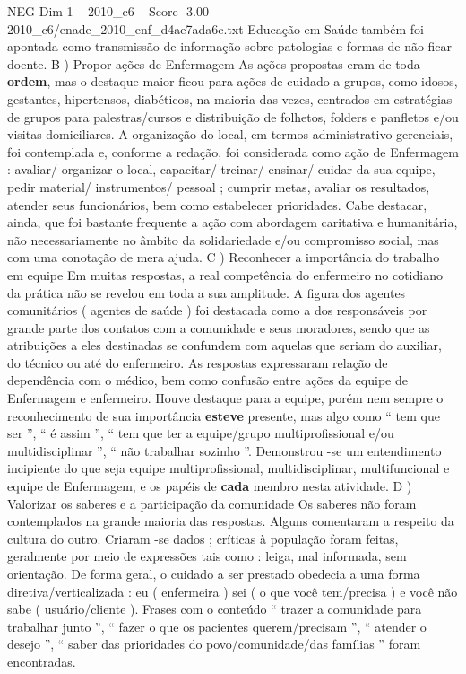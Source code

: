 \begin{textsample}{NEG Dim 1 – 2010\_c6 – Score -3.00 – 2010\_c6/enade\_2010\_enf\_d4ae7ada6c.txt}
Educação em Saúde também foi apontada como transmissão de informação sobre patologias e formas de não ficar doente.
B ) Propor ações de Enfermagem As ações propostas eram de toda \textbf{ordem}, mas o destaque maior ficou para ações de cuidado a grupos, como idosos, gestantes, hipertensos, diabéticos, na maioria das vezes, centrados em estratégias de grupos para palestras/cursos e distribuição de folhetos, folders e panfletos e/ou visitas domiciliares.
A organização do local, em termos administrativo-gerenciais, foi contemplada e, conforme a redação, foi considerada como ação de Enfermagem : avaliar/ organizar o local, capacitar/ treinar/ ensinar/ cuidar da sua equipe, pedir material/ instrumentos/ pessoal ; cumprir metas, avaliar os resultados, atender seus funcionários, bem como estabelecer prioridades.
Cabe destacar, ainda, que foi bastante frequente a ação com abordagem caritativa e humanitária, não necessariamente no âmbito da solidariedade e/ou compromisso social, mas com uma conotação de mera ajuda.
C ) Reconhecer a importância do trabalho em equipe Em muitas respostas, a real competência do enfermeiro no cotidiano da prática não se revelou em toda a sua amplitude.
A figura dos agentes comunitários ( agentes de saúde ) foi destacada como a dos responsáveis por grande parte dos contatos com a comunidade e seus moradores, sendo que as atribuições a eles destinadas se confundem com aquelas que seriam do auxiliar, do técnico ou até do enfermeiro.
As respostas expressaram relação de dependência com o médico, bem como confusão entre ações da equipe de Enfermagem e enfermeiro.
Houve destaque para a equipe, porém nem sempre o reconhecimento de sua importância \textbf{esteve} presente, mas algo como “ tem que ser ”, “ é assim ”, “ tem que ter a equipe/grupo multiprofissional e/ou multidisciplinar ”, “ não trabalhar sozinho ”.
Demonstrou -se um entendimento incipiente do que seja equipe multiprofissional, multidisciplinar, multifuncional e equipe de Enfermagem, e os papéis de \textbf{cada} membro nesta atividade.
D ) Valorizar os saberes e a participação da comunidade Os saberes não foram contemplados na grande maioria das respostas.
Alguns comentaram a respeito da cultura do outro.
Criaram -se dados ; críticas à população foram feitas, geralmente por meio de expressões tais como : leiga, mal informada, sem orientação.
De forma geral, o cuidado a ser prestado obedecia a uma forma diretiva/verticalizada : eu ( enfermeira ) sei ( o que você tem/precisa ) e você não sabe ( usuário/cliente ).
Frases com o conteúdo “ trazer a comunidade para trabalhar junto ”, “ fazer o que os pacientes querem/precisam ”, “ atender o desejo ”, “ saber das prioridades do povo/comunidade/das famílias ” foram encontradas.

\end{textsample}
